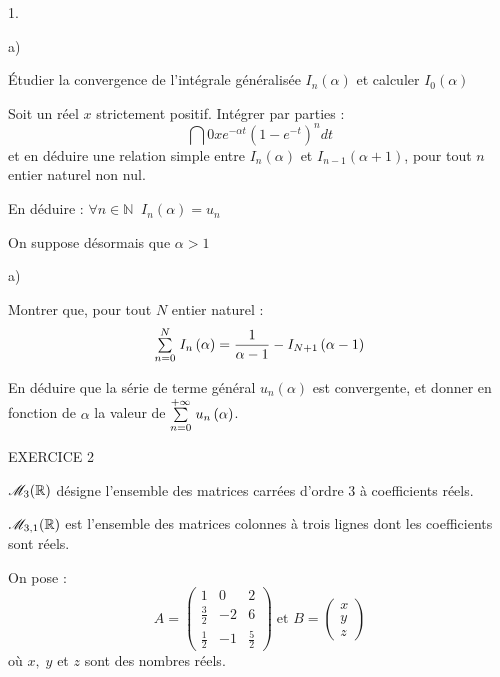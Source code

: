 \documentclass[11pt]{article}%
\begin{document}
\begin{noliste}{1.}
\begin{noliste}{a)}
 \setlength{\itemsep}{2mm}
\item Étudier la convergence de l'intégrale généralisée $I_{n}\left(
\alpha \right) $ et calculer $I_{0}\left( \alpha \right) $

\item Soit un réel $x$ strictement positif. Intégrer par parties : 
\[
\dint{0}{x}e^{-\alpha t}\left( 1-e^{-t}\right) ^{n}dt 
\]
et en déduire une relation simple entre $I_{n}\left( \alpha \right) $
et 
$I_{n-1}\left( \alpha + 1\right) $, pour tout $n$ entier naturel non
nul.

\item En déduire : $\forall n\in \mathbb{N\;\;}I_{n}\left( \alpha
\right) = u_{n}$
\end{noliste}

\item On suppose désormais que $\alpha >1$

\begin{noliste}{a)}
 \setlength{\itemsep}{2mm}
\item Montrer que, pour tout $N$ entier naturel : 
\[
{\textstyle\sum\limits_{n = 0}^{N}}\hspace{.1cm}I_{n}\left( \alpha \right) = \frac{1}{\alpha -1}-I_{N +
1}\left(
\alpha -1\right) 
\]

\item En déduire que la série de terme général $u_{n}\left(
\alpha \right) $ est convergente, et donner en fonction de $\alpha $ la
valeur de ${\textstyle\sum\limits_{n = 0}^{+ \infty }}\hspace{.1cm}u_{n}\left( \alpha \right) $.
\end{noliste}
\end{noliste}

\begin{center}
{\LARGE EXERCICE 2}
\end{center}

$\mathscr{M}_{3}(\mathbb{R}) $ désigne l'ensemble des
matrices carrées d'ordre 3 à coefficients réels.

$\mathscr{M}_{3,1}(\mathbb{R}) $ est l'ensemble des matrices
colonnes à trois lignes dont les coefficients sont réels.

On pose : 
\[
A = \left( 
\begin{array}{lll}
1 & 0 & 2 \\
\frac{3}{2} & -2 & 6 \\
\frac{1}{2} & -1 & \frac{5}{2}
\end{array}
\right) \;\text{et }B = \left( 
\begin{array}{c}
x \\
y \\
z
\end{array}
\right) 
\]
où $x,\;y$ et $z$ sont des nombres réels.
\end{document}
